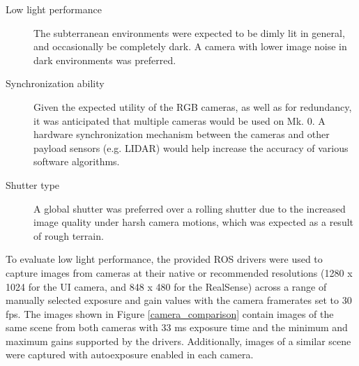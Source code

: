 \begin{description}
	\item[Low light performance] The subterranean environments were expected to be dimly lit in general, and occasionally be completely dark. A camera with lower image noise in dark environments was preferred.
	\item[Synchronization ability] Given the expected utility of the RGB cameras, as well as for redundancy, it was anticipated that multiple cameras would be used on Mk. 0. A hardware synchronization mechanism between the cameras and other payload sensors (e.g. LIDAR) would help increase the accuracy of various software algorithms.
	\item[Shutter type] A global shutter was preferred over a rolling shutter due to the increased image quality under harsh camera motions, which was expected as a result of rough terrain.
\end{description}

To evaluate low light performance, the provided ROS \cite{quigley2009ros} drivers were used to capture images from cameras at their native or recommended resolutions (1280 x 1024 for the UI camera, and 848 x 480 for the RealSense) across a range of manually selected exposure and gain values with the camera framerates set to 30 fps. The images shown in Figure \ref{camera_comparison} contain images of the same scene from both cameras with 33 ms exposure time and the minimum and maximum gains supported by the drivers. Additionally, images of a similar scene were captured with autoexposure enabled in each camera.


